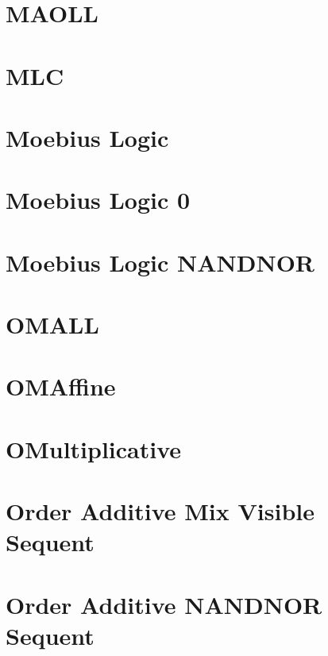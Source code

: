 \documentclass{report}
\begin{document}
\chapter{MAOLL}


\chapter{MLC}


\chapter{Moebius Logic}


\chapter{Moebius Logic 0}


\chapter{Moebius Logic NANDNOR}


\chapter{OMALL}


\chapter{OMAffine}


\chapter{OMultiplicative}


\chapter{Order Additive Mix Visible Sequent}


\chapter{Order Additive NANDNOR Sequent}

\end{document}
